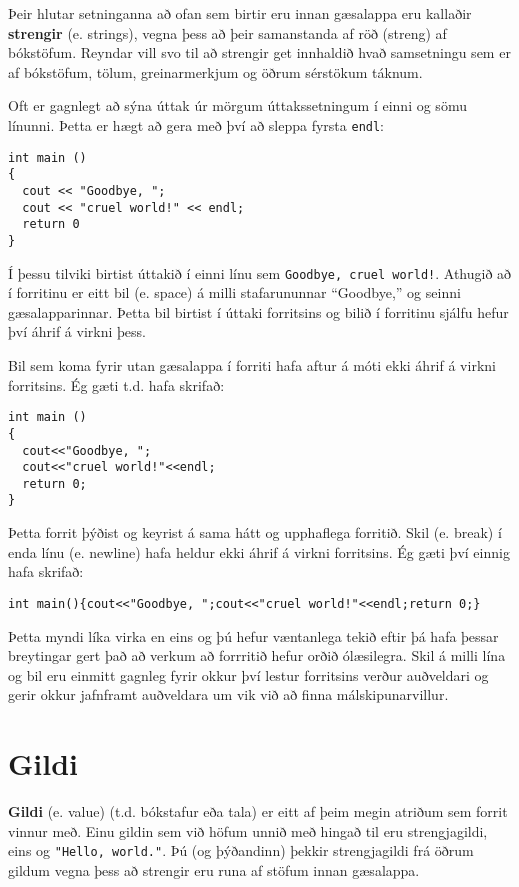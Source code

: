 
Þeir hlutar setninganna að ofan sem birtir eru innan gæsalappa eru kallaðir {\bf strengir} (e. strings),
vegna þess að þeir samanstanda af röð (streng) af bókstöfum.
Reyndar vill svo til að strengir get innhaldið hvað samsetningu sem er af bókstöfum, tölum, greinarmerkjum og öðrum sérstökum táknum.


Oft er gagnlegt að sýna úttak úr mörgum úttakssetningum í einni og sömu línunni.
Þetta er hægt að gera með því að sleppa fyrsta {\tt endl}:

\begin{verbatim}
int main ()
{
  cout << "Goodbye, ";
  cout << "cruel world!" << endl;
  return 0
}
\end{verbatim}
%
Í þessu tilviki birtist úttakið í einni línu sem {\tt Goodbye, cruel world!}.
Athugið að í forritinu er eitt bil (e. space) á milli stafarununnar ``Goodbye,'' og seinni gæsalapparinnar.
Þetta bil birtist í úttaki forritsins og bilið í forritinu sjálfu hefur því áhrif á virkni þess.

Bil sem koma fyrir utan gæsalappa í forriti hafa aftur á móti ekki áhrif á virkni forritsins.
Ég gæti t.d. hafa skrifað:

\begin{verbatim}
int main ()
{
  cout<<"Goodbye, ";
  cout<<"cruel world!"<<endl;
  return 0;
}
\end{verbatim}
%
Þetta forrit þýðist og keyrist á sama hátt og upphaflega forritið.
Skil (e. break) í enda línu (e. newline) hafa heldur ekki áhrif á virkni forritsins.
Ég gæti því einnig hafa skrifað:

\begin{verbatim}
int main(){cout<<"Goodbye, ";cout<<"cruel world!"<<endl;return 0;}
\end{verbatim}
%
Þetta myndi líka virka en eins og þú hefur væntanlega tekið eftir þá hafa þessar breytingar gert það að verkum að forrritið hefur orðið ólæsilegra.
Skil á milli lína og bil eru einmitt gagnleg fyrir okkur því lestur forritsins verður auðveldari og gerir okkur jafnframt auðveldara um vik við að finna málskipunarvillur.

\section{Gildi}

{\bf Gildi} (e. value) (t.d. bókstafur eða tala) er eitt af þeim megin atriðum sem forrit vinnur með.
Einu gildin sem við höfum unnið með hingað til eru strengjagildi, eins og \verb+"Hello, world."+.
Þú (og þýðandinn) þekkir strengjagildi frá öðrum gildum vegna þess að strengir eru runa af stöfum innan gæsalappa.

